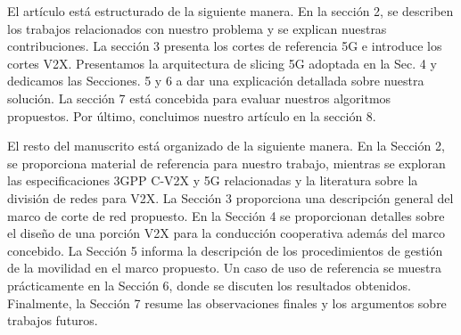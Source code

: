 El artículo está estructurado de la siguiente manera. En la sección 2, se describen los trabajos relacionados con nuestro problema y se explican nuestras contribuciones. La sección 3 presenta los cortes de referencia 5G e introduce los cortes V2X. Presentamos la arquitectura de slicing 5G adoptada en la Sec. 4 y dedicamos las Secciones. 5 y 6 a dar una explicación detallada sobre nuestra solución. La sección 7 está concebida para evaluar nuestros algoritmos propuestos. Por último, concluimos nuestro artículo en la sección 8.

El resto del manuscrito está organizado de la siguiente manera. En la Sección 2, se proporciona material de referencia para nuestro trabajo, mientras se exploran las especificaciones 3GPP C-V2X y 5G relacionadas y la literatura sobre la división de redes para V2X. La Sección 3 proporciona una descripción general del marco de corte de red propuesto. En la Sección 4 se proporcionan detalles sobre el diseño de una porción V2X para la conducción cooperativa además del marco concebido. La Sección 5 informa la descripción de los procedimientos de gestión de la movilidad en el marco propuesto. Un caso de uso de referencia se muestra prácticamente en la Sección 6, donde se discuten los resultados obtenidos. Finalmente, la Sección 7 resume las observaciones finales y los argumentos sobre trabajos futuros.
